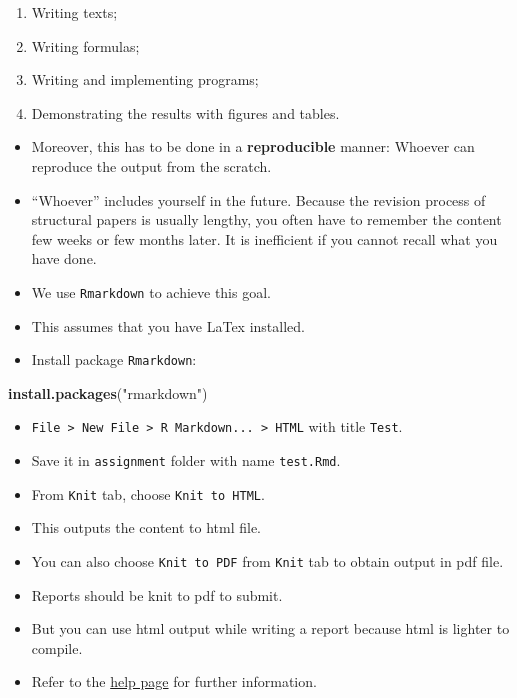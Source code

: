 \documentclass[]{book}
\newenvironment{Shaded}{\begin{snugshade}}{\end{snugshade}}
\newcommand{\KeywordTok}[1]{\textcolor[rgb]{0.13,0.29,0.53}{\textbf{#1}}}
\newcommand{\StringTok}[1]{\textcolor[rgb]{0.31,0.60,0.02}{#1}}
\newcommand{\NormalTok}[1]{#1}
\providecommand{\tightlist}{%
  \setlength{\itemsep}{0pt}\setlength{\parskip}{0pt}}
\begin{document}
\begin{enumerate}
\def\labelenumi{\arabic{enumi}.}
\tightlist
\item
  Writing texts;
\item
  Writing formulas;
\item
  Writing and implementing programs;
\item
  Demonstrating the results with figures and tables.
\end{enumerate}

\begin{itemize}
\item
  Moreover, this has to be done in a \textbf{reproducible} manner:
  Whoever can reproduce the output from the scratch.
\item
  ``Whoever'' includes yourself in the future. Because the revision
  process of structural papers is usually lengthy, you often have to
  remember the content few weeks or few months later. It is inefficient
  if you cannot recall what you have done.
\item
  We use \texttt{Rmarkdown} to achieve this goal.
\item
  This assumes that you have LaTex installed.
\item
  Install package \texttt{Rmarkdown}:
\end{itemize}

\begin{Shaded}
\begin{Highlighting}[]
\KeywordTok{install.packages}\NormalTok{(}\StringTok{"rmarkdown"}\NormalTok{)}
\end{Highlighting}
\end{Shaded}

\begin{itemize}
\tightlist
\item
  \texttt{File\ \textgreater{}\ New\ File\ \textgreater{}\ R\ Markdown...\ \textgreater{}\ HTML}
  with title \texttt{Test}.
\item
  Save it in \texttt{assignment} folder with name \texttt{test.Rmd}.
\item
  From \texttt{Knit} tab, choose \texttt{Knit\ to\ HTML}.
\item
  This outputs the content to html file.
\item
  You can also choose \texttt{Knit\ to\ PDF} from \texttt{Knit} tab to
  obtain output in pdf file.
\item
  Reports should be knit to pdf to submit.
\item
  But you can use html output while writing a report because html is
  lighter to compile.
\item
  Refer to the \href{https://rmarkdown.rstudio.com/lesson-1.html}{help
  page} for further information.
\end{itemize}
\end{document}
